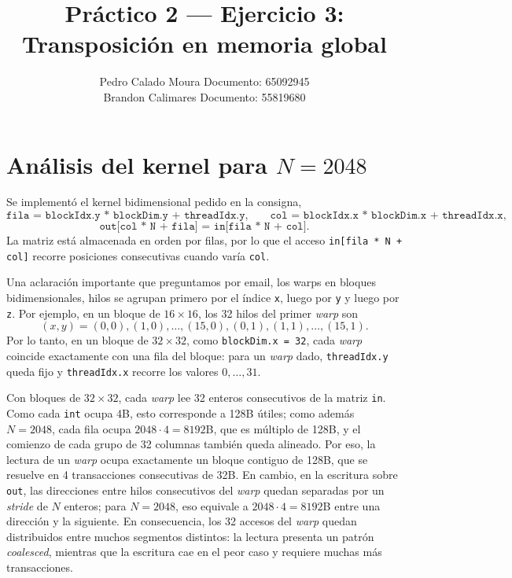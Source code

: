 \documentclass[10pt,a4paper]{article}
\title{Práctico 2 --- Ejercicio 3: Transposición en memoria global}
\author{%
  Pedro Calado Moura \quad Documento: 65092945\\
  Brandon Calimares \quad Documento: 55819680
}
\date{}
\begin{document}
\maketitle

\section*{Análisis del kernel para $N=2048$}
Se implementó el kernel bidimensional pedido en la consigna,
\[
\texttt{fila = blockIdx.y * blockDim.y + threadIdx.y,}\qquad
\texttt{col = blockIdx.x * blockDim.x + threadIdx.x,}
\]
\[
\texttt{out[col * N + fila] = in[fila * N + col].}
\]
La matriz está almacenada en orden por filas, por lo que el acceso \texttt{in[fila * N + col]} recorre posiciones consecutivas cuando varía \texttt{col}.

Una aclaración importante que preguntamos por email, los warps en bloques bidimensionales, hilos se agrupan primero por el índice \texttt{x}, luego por \texttt{y} y luego por \texttt{z}. Por ejemplo, en un bloque de $16\times 16$, los 32 hilos del primer \emph{warp} son
\[(x,y)=(0,0),(1,0),\dots,(15,0),(0,1),(1,1),\dots,(15,1).
\]
Por lo tanto, en un bloque de $32\times 32$, como \texttt{blockDim.x = 32}, cada \emph{warp} coincide exactamente con una fila del bloque: para un \emph{warp} dado, \texttt{threadIdx.y} queda fijo y \texttt{threadIdx.x} recorre los valores $0,\dots,31$.

Con bloques de $32\times 32$, cada \emph{warp} lee 32 enteros consecutivos de la matriz \texttt{in}. Como cada \texttt{int} ocupa 4B, esto corresponde a 128B útiles; como además $N=2048$, cada fila ocupa $2048\cdot 4 = 8192$B, que es múltiplo de 128B, y el comienzo de cada grupo de 32 columnas también queda alineado. Por eso, la lectura de un \emph{warp} ocupa exactamente un bloque contiguo de 128B, que se resuelve en 4 transacciones consecutivas de 32B. En cambio, en la escritura sobre \texttt{out}, las direcciones entre hilos consecutivos del \emph{warp} quedan separadas por un \emph{stride} de $N$ enteros; para $N=2048$, eso equivale a $2048\cdot 4 = 8192$B entre una dirección y la siguiente. En consecuencia, los 32 accesos del \emph{warp} quedan distribuidos entre muchos segmentos distintos: la lectura presenta un patrón \emph{coalesced}, mientras que la escritura cae en el peor caso y requiere muchas más transacciones.
\end{document}
